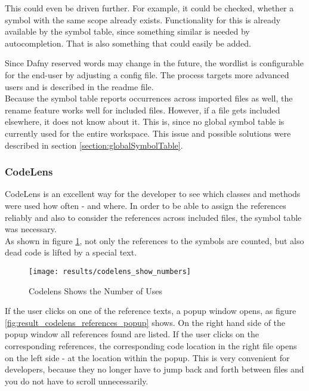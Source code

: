 This could even be driven further.
For example, it could be checked, whether a symbol with the same scope already exists.
Functionality for this is already available by the symbol table, since something similar is needed by autocompletion.
That is also something that could easily be added.

Since Dafny reserved words may change in the future, the wordlist is configurable for the end-user by adjusting a config file.
The process targets more advanced users and is described in the readme file.\\

Because the symbol table reports occurrences across imported files as well, the rename feature works well for included files.
However, if a file gets included elsewhere, it does not know about it.
This is, since no global symbol table is currently used for the entire workspace.
This issue and possible solutions were described in section \ref{section:globalSymbolTable}.\\

\subsubsection{CodeLens}
CodeLens is an excellent way for the developer to see which classes and methods were used how often - and where.
In order to be able to assign the references reliably and
also to consider the references across included files, the symbol table was necessary. \\

As shown in figure \ref{fig:result_codelens_references},
not only the references to the symbols are counted,
but also dead code is lifted by a special text.

\begin{figure}[H]
    \centering
    \texttt{[image: results/codelens\_show\_numbers]}
    \caption{Codelens Shows the Number of Uses}
    \label{fig:result_codelens_references}
\end{figure}

If the user clicks on one of the reference texts, a popup window opens,
as figure \ref{fig:result_codelens_references_popup} shows.
On the right hand side of the popup window all references found are listed.
If the user clicks on the corresponding references, the corresponding code
location in the right file opens on the left side - at the location within the popup.
This is very convenient for developers,
because they no longer have to jump back and forth between files and you do not have to scroll unnecessarily.

